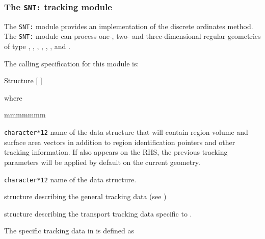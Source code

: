 \subsubsection{The {\tt SNT:} tracking module}\label{sect:SNData}

The {\tt SNT:} module provides an implementation of the discrete ordinates method. The {\tt SNT:} module can process one-, two- and three-dimensional regular
geometries of type , , , , , ,  and .

\vskip 0.2cm

The calling specification for this module is:

\begin{DataStructure}{Structure }
\moc{:=}  $[$  $]$ 
 \moc{::}   
\end{DataStructure}

\noindent  where
\begin{ListeDeDescription}{mmmmmmm}

\item[\dusa{TRKNAM}] {\tt character*12} name of the  data
structure that will contain region volume and surface area vectors in
addition to region identification pointers and other tracking information.
If  also appears on the RHS, the previous tracking 
parameters will be applied by default on the current geometry.

\item[\dusa{GEONAM}] {\tt character*12} name of the  data
structure.

\item[\dstr{desctrack}] structure describing the general tracking data (see
)

\item[\dstr{descsn}] structure describing the transport tracking data
specific to .

\end{ListeDeDescription}

\vskip 0.2cm

The  specific tracking data in  is defined as

